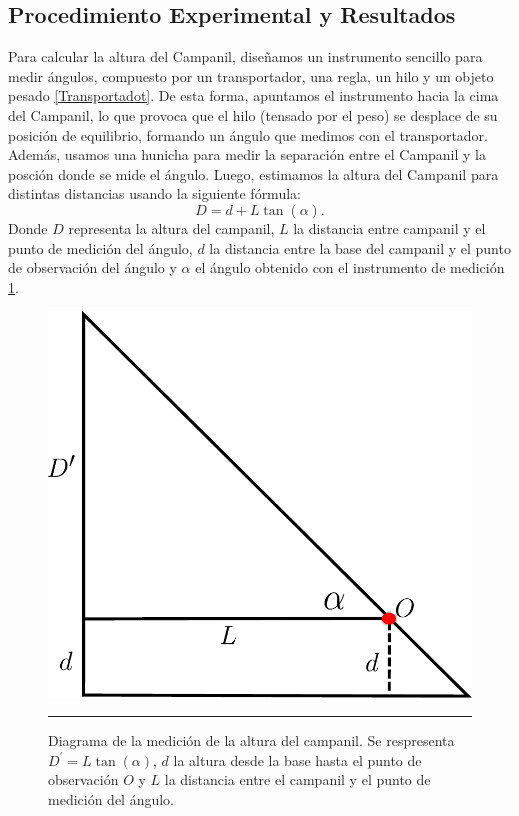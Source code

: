\documentclass[10pt,a4paper]{article}
\begin{document}
\begin{multicols}{2}
		\section{Procedimiento Experimental y Resultados}
		Para calcular la altura del Campanil, diseñamos un instrumento sencillo para medir ángulos, compuesto por un transportador, una regla, un hilo y un objeto pesado \ref{Transportadot}. De esta forma, apuntamos el instrumento hacia la cima del Campanil, lo que provoca que el hilo (tensado por el peso) se desplace de su posición de equilibrio, formando un ángulo que medimos con el transportador. Además, usamos una hunicha para medir la separación entre el Campanil y la posción donde se mide el ángulo. Luego, estimamos la altura del Campanil para distintas distancias usando la siguiente fórmula:
		\begin{equation}\label{Ec. altura}
		D = d + L \tan(\alpha).
		\end{equation}
		Donde $D$ representa la altura del campanil, $L$ la distancia entre campanil y el punto de medición del ángulo, $d$ la distancia entre la base del campanil y el punto de observación del ángulo y $\alpha$ el ángulo obtenido con el instrumento de medición \ref{Diagrama campanil}.
		
		
		\begin{figure}[H]
			\centering
			\includegraphics[scale=0.25]{IMG/camp.pdf}
			\caption{Diagrama de la medición de la altura del campanil. Se respresenta $D^{\prime} = L \tan(\alpha)$,  $d$ la altura desde la base hasta el punto de observación $O$ y $L$ la distancia entre el campanil y el punto de medición del ángulo.} 
			\label{Diagrama campanil}
			\rule{80mm}{0.1mm}
		\end{figure}
		

\end{multicols}
\end{document}
